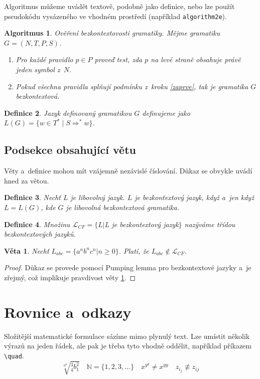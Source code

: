 \documentclass[a4paper, 11pt, twocolumn]{article}[18.03.2012]
\newtheorem{defi}{Definice}[section]
\newtheorem{algo}[defi]{Algoritmus}
\newtheorem{veta}{Věta}
\begin{document}
Algoritmus můžeme uvádět textově, podobně jako definice, nebo lze použít
pseudokódu vysázeného ve vhodném prostředí (například \texttt{algorithm2e}).

\begin{algo}
\emph{Ověření bezkontextovosti gramatiky.} Mějme gramatiku $G=(N,T,P,S)$.
\begin{enumerate}
  \item Pro každé pravidlo $p\in P$ proveď test, zda $p$ na levé straně obsahuje právě
jeden symbol z~$N$.\label{zaprve}
  \item Pokud všechna pravidla splňují podmínku z~kroku \ref{zaprve}, tak je gramatika $G$
bezkontextová.
\end{enumerate}
\end{algo}

\begin{defi}
Jazyk definovaný gramatikou $G$ definujeme jako $L(G)=\{w\in T^*\;|\;S\Rightarrow^* w\}$.
\end{defi}

\subsection{Podsekce obsahující větu}
Věty a~definice mohou mít vzájemně nezávislé číslování. Důkaz se obvykle uvádí
hned za větou.

\begin{defi}
Nechť $L$ je libovolný jazyk. $L$ \emph{je bezkontextový jazyk},
když a~jen když $L=L(G)$, kde $G$ je libovolná bezkontextová gramatika.
\end{defi}
\begin{defi}
Množinu $\mathcal{L}_{CF}=\{L|$L je bezkontextový jazyk$\}$
nazýváme třídou bezkontextových jazyků.
\end{defi}
\begin{veta} \label{vetajedna}
Nechť $L_{abc}=\{a^nb^nc^n|n\geq 0\}$. Platí, že $L_{abc}\notin \mathcal{L}_{CF}$.
\end{veta}
\begin{proof}
Důkaz se provede pomocí Pumping lemma pro bezkontextové jazyky a~je
zřejmý, což implikuje pravdivost věty \ref{vetajedna}.
\end{proof}
\section{Rovnice a~odkazy}
Složitější matematické formulace sázíme mimo plynulý text. Lze umístit několik
výrazů na jeden řádek, ale pak je třeba tyto vhodně oddělit, například příkazem
\verb|\quad|.
\[\sqrt[a^8]{_4^3b^2_1}\quad \mathbb{N}=\{1,2,3,\dotsc\}\quad x^{y^y}\neq x^{yy}\quad z_{i_j}\not\equiv z_{ij}\]
\end{document}

